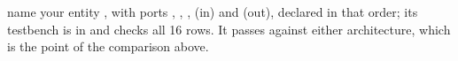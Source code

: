 
\selfcheck name your entity , with ports , , , 
(in) and  (out), declared in that order; its testbench is in 
and checks all 16 rows. It passes against either architecture, which is the point of the comparison
above.
